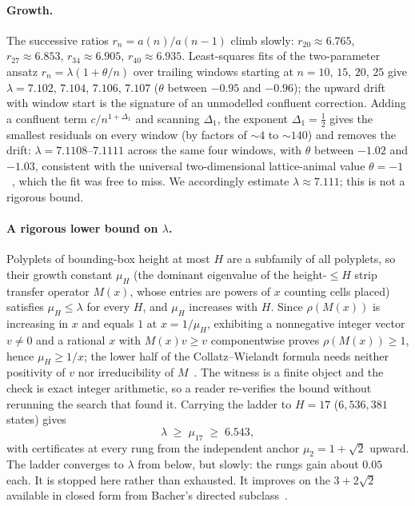 \documentclass[11pt]{article}
\begin{document}
\paragraph{Growth.}
The successive ratios $r_n=a(n)/a(n{-}1)$ climb slowly:
$r_{20}\approx6.765$, $r_{27}\approx6.853$, $r_{34}\approx6.905$,
$r_{40}\approx6.935$. Least-squares fits of the two-parameter ansatz
$r_n=\lambda(1+\theta/n)$ over trailing windows starting at $n=10$, $15$,
$20$, $25$ give $\lambda=7.102$, $7.104$, $7.106$, $7.107$ ($\theta$
between $-0.95$ and $-0.96$); the upward drift with window start is the
signature of an unmodelled confluent correction. Adding a confluent term
$c/n^{1+\Delta_1}$ and scanning $\Delta_1$, the exponent
$\Delta_1=\tfrac12$ gives the smallest residuals on every window (by
factors of ${\sim}4$ to ${\sim}140$) and removes the drift:
$\lambda=7.1108$--$7.1111$ across the same four windows, with $\theta$
between $-1.02$ and $-1.03$, consistent with the universal
two-dimensional lattice-animal value $\theta=-1$~\cite{jensen2001}, which
the fit was free to miss. We accordingly estimate $\lambda\approx7.111$;
this is not a rigorous bound.

\paragraph{A rigorous lower bound on $\lambda$.}
Polyplets of bounding-box height at most $H$ are a subfamily of all
polyplets, so their growth constant $\mu_H$ (the dominant eigenvalue of the
height-$\le H$ strip transfer operator $M(x)$, whose entries are powers of
$x$ counting cells placed) satisfies $\mu_H\le\lambda$ for every $H$, and
$\mu_H$ increases with $H$. Since
$\rho(M(x))$ is increasing in $x$ and equals $1$ at $x=1/\mu_H$, exhibiting a
nonnegative integer vector $v\ne0$ and a rational $x$ with $M(x)v\ge v$
componentwise proves $\rho(M(x))\ge1$, hence $\mu_H\ge1/x$; the lower half of
the Collatz--Wielandt formula needs neither positivity of $v$ nor
irreducibility of $M$~\cite{hornjohnson}. The witness is a finite object and
the check is exact integer arithmetic, so a reader re-verifies the bound
without rerunning the search that found it. Carrying the ladder to $H=17$
($6{,}536{,}381$ states) gives
\[
  \lambda \;\ge\; \mu_{17} \;\ge\; 6.543 ,
\]
with certificates at every rung from the independent anchor
$\mu_2=1+\sqrt2$ upward. The ladder converges to $\lambda$ from below, but
slowly: the rungs gain about $0.05$ each. It is stopped here rather than
exhausted. It improves on the $3+2\sqrt2$ available in closed form from
Bacher's directed subclass~\cite{bacher}.
\end{document}
